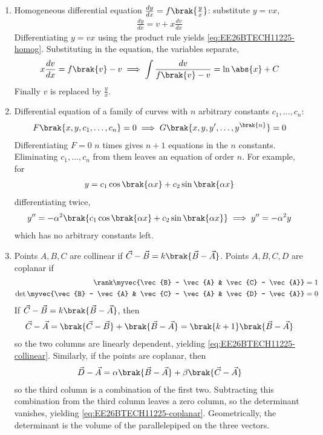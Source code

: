 \begin{enumerate}[label=\thesubsection.\arabic*, ref=\thesubsection.\theenumi]
\item Homogeneous differential equation $\frac{dy}{dx} = f\brak{\frac{y}{x}}$: substitute $y = vx$,
\begin{align}
	\frac{dy}{dx} = v + x\frac{dv}{dx}
	\label{eq:EE26BTECH11225-homog}
\end{align}
\solution
Differentiating $y = vx$ using the product rule yields \eqref{eq:EE26BTECH11225-homog}. Substituting in the equation, the variables separate,
\begin{align}
	x\frac{dv}{dx} = f\brak{v} - v
	\implies \int\frac{dv}{f\brak{v} - v} = \ln\abs{x} + C
\end{align}
Finally $v$ is replaced by $\frac{y}{x}$.

\item Differential equation of a family of curves with $n$ arbitrary constants $c_1, \ldots, c_n$:
\begin{align}
	F\brak{x, y, c_1, \ldots, c_n} = 0
	\implies G\brak{x, y, y^{\prime}, \ldots, y^{\brak{n}}} = 0
	\label{eq:EE26BTECH11225-family}
\end{align}
\solution
Differentiating $F = 0$ $n$ times gives $n + 1$ equations in the $n$ constants. Eliminating $c_1, \ldots, c_n$ from them leaves an equation of order $n$. For example, for
\begin{align}
	y = c_1\cos\brak{\alpha x} + c_2\sin\brak{\alpha x}
\end{align}
differentiating twice,
\begin{align}
	y^{\prime\prime} = -\alpha^2\brak{c_1\cos\brak{\alpha x} + c_2\sin\brak{\alpha x}}
	\implies y^{\prime\prime} = -\alpha^2 y
\end{align}
which has no arbitrary constants left.

\item Points $A, B, C$ are collinear if $\vec{C} - \vec{B} = k\brak{\vec{B} - \vec{A}}$. Points $A, B, C, D$ are coplanar if
\begin{align}
	\rank\myvec{\vec{B} - \vec{A} & \vec{C} - \vec{A}} &= 1
	\label{eq:EE26BTECH11225-collinear}
	\\
	\det\myvec{\vec{B} - \vec{A} & \vec{C} - \vec{A} & \vec{D} - \vec{A}} &= 0
	\label{eq:EE26BTECH11225-coplanar}
\end{align}
\solution
If $\vec{C} - \vec{B} = k\brak{\vec{B} - \vec{A}}$, then
\begin{align}
	\vec{C} - \vec{A} = \brak{\vec{C} - \vec{B}} + \brak{\vec{B} - \vec{A}} = \brak{k + 1}\brak{\vec{B} - \vec{A}}
\end{align}
so the two columns are linearly dependent, yielding \eqref{eq:EE26BTECH11225-collinear}. Similarly, if the points are coplanar, then
\begin{align}
	\vec{D} - \vec{A} = \alpha\brak{\vec{B} - \vec{A}} + \beta\brak{\vec{C} - \vec{A}}
\end{align}
so the third column is a combination of the first two. Subtracting this combination from the third column leaves a zero column, so the determinant vanishes, yielding \eqref{eq:EE26BTECH11225-coplanar}. Geometrically, the determinant is the volume of the parallelepiped on the three vectors.


\end{enumerate}
